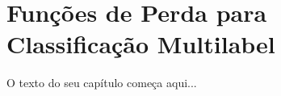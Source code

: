 
\chapter{Funções de Perda para Classificação Multilabel}
\label{cap:perda-multi}

O texto do seu capítulo começa aqui...
